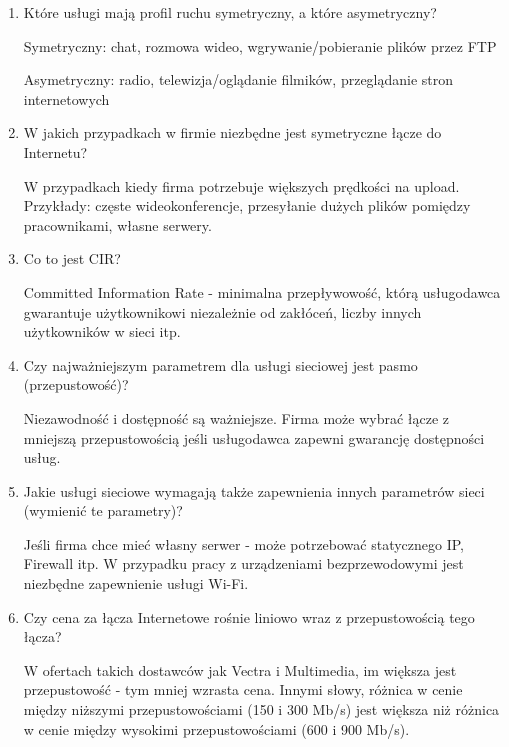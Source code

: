 \documentclass[12pt,a4paper,titlepage]{article}
\begin{document}
\begin{enumerate}
\item Które usługi mają profil ruchu symetryczny, a które asymetryczny?

\vspace{0.2cm}
Symetryczny: chat, rozmowa wideo, wgrywanie/pobieranie plików przez FTP

\vspace{0.1cm}
Asymetryczny: radio, telewizja/oglądanie filmików, przeglądanie stron internetowych

\item W jakich przypadkach w firmie niezbędne jest symetryczne łącze do Internetu? 

\vspace{0.2cm}W przypadkach kiedy firma potrzebuje większych prędkości na upload. Przykłady: częste wideokonferencje, przesyłanie dużych plików pomiędzy pracownikami, własne serwery.


\item Co to jest CIR? 

\vspace{0.2cm}
Committed Information Rate - minimalna przepływowość, którą usługodawca gwarantuje użytkownikowi niezależnie od zakłóceń, liczby innych użytkowników w sieci itp.


\item Czy najważniejszym parametrem dla usługi sieciowej jest pasmo (przepustowość)? 

\vspace{0.2cm}
Niezawodność i dostępność są ważniejsze. Firma może wybrać łącze z mniejszą przepustowością jeśli usługodawca zapewni gwarancję dostępności usług.


\item Jakie usługi sieciowe wymagają także zapewnienia innych parametrów sieci (wymienić te parametry)? 

\vspace{0.2cm}
Jeśli firma chce mieć własny serwer - może potrzebować statycznego IP, Firewall itp. W przypadku pracy z urządzeniami bezprzewodowymi jest niezbędne zapewnienie usługi Wi-Fi.


\item Czy cena za łącza Internetowe rośnie liniowo wraz z przepustowością tego łącza? 

\vspace{0.2cm}
W ofertach takich dostawców jak Vectra i Multimedia, im większa jest przepustowość - tym mniej wzrasta cena. Innymi słowy, różnica w cenie między niższymi przepustowościami (150 i 300 Mb/s) jest większa niż różnica w cenie między wysokimi przepustowościami (600 i 900 Mb/s).
\end{enumerate}
\end{document}
